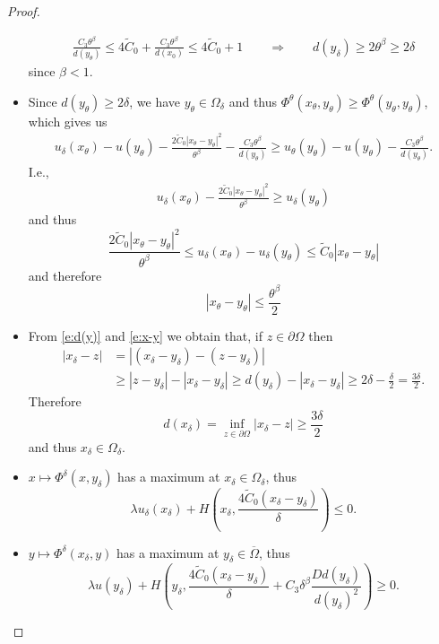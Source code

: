 \documentclass[11pt,reqno]{amsart}
\numberwithin{figure}{section}
\theoremstyle{plain}
\theoremstyle{remark}
\numberwithin{equation}{section}
\begin{document}
\begin{proof}
\begin{itemize}
    \begin{align}\label{e:d(y)}
        \frac{C_3\theta^\beta}{d(y_\theta)} \leq 4\tilde{C}_0 + \frac{C_3 \theta^\beta}{d(x_0)}  \leq 4\tilde{C}_0 + 1 \qquad\Longrightarrow\qquad d(y_\delta) \geq 2\theta^\beta \geq 2\delta
    \end{align}
    since $\beta < 1$.
    \item Since $d(y_\theta)\geq 2\delta$, we have $y_\theta\in \Omega_\delta$ and thus $\Phi^\theta(x_\theta,y_\theta) \geq \Phi^\theta(y_\theta,y_\theta)$, which gives us
    \begin{align*}
        u_\delta(x_\theta) - u(y_\theta) - \frac{2\tilde{C}_0|x_\theta - y_\theta|^2}{\theta^\beta} - \frac{C_3\theta^\beta}{d(y_\theta)} \geq u_\theta(y_\theta) - u(y_\theta) - \frac{C_3\theta^\beta}{d(y_\theta)}. 
    \end{align*}
    I.e.,
    \begin{align*}
        u_\delta(x_\theta)  - \frac{2\tilde{C}_0|x_\theta- y_\theta|^2}{\theta^\beta} \geq u_\delta(y_\theta) 
    \end{align*}
    and thus
    \begin{equation*}
        \frac{2\tilde{C}_0|x_\theta-y_\theta|^2}{\theta^\beta} \leq u_\delta(x_\theta) - u_\delta(y_\theta) \leq \tilde{C}_0|x_\theta-y_\theta|
    \end{equation*}
    and therefore
    \begin{equation}\label{e:x-y}
        |x_\theta-y_\theta|\leq \frac{\theta^\beta}{2}
    \end{equation}
    \item From \eqref{e:d(y)} and \eqref{e:x-y} we obtain that, if $z\in \partial\Omega$ then
    \begin{align*}
        |x_\delta - z| &= |(x_\delta - y_\delta) - (z - y_\delta)| \\
        &\geq |z-y_\delta| - |x_\delta - y_\delta| \geq d(y_\delta) - |x_\delta - y_\delta| \geq 2\delta - \frac{\delta}{2} = \frac{3\delta}{2}.
    \end{align*}
    Therefore
    \begin{equation*}
        d(x_\delta) = \inf_{z\in \partial\Omega} |x_\delta - z|  \geq \frac{3\delta}{2}
    \end{equation*}
    and thus $x_\delta\in \Omega_\delta$.
    \item $x\mapsto \Phi^\delta(x,y_\delta)$ has a maximum at $x_\delta\in \Omega_\delta$, thus
    \begin{equation*}
        \lambda u_\delta(x_\delta) + H\left(x_\delta, \frac{4\tilde{C}_0(x_\delta-y_\delta)}{\delta}\right) \leq 0.
    \end{equation*}
    \item $y\mapsto \Phi^\delta(x_\delta,y)$ has a maximum at $y_\delta\in \overline{\Omega}$, thus
    \begin{equation*}
        \lambda u(y_\delta) + H\left(y_\delta,\frac{4\tilde{C}_0(x_\delta-y_\delta)}{\delta} + C_3\delta^\beta\frac{Dd(y_\delta)}{d(y_\delta)^2} \right) \geq 0.
    \end{equation*}
\end{itemize}
\end{proof}
\end{document}

